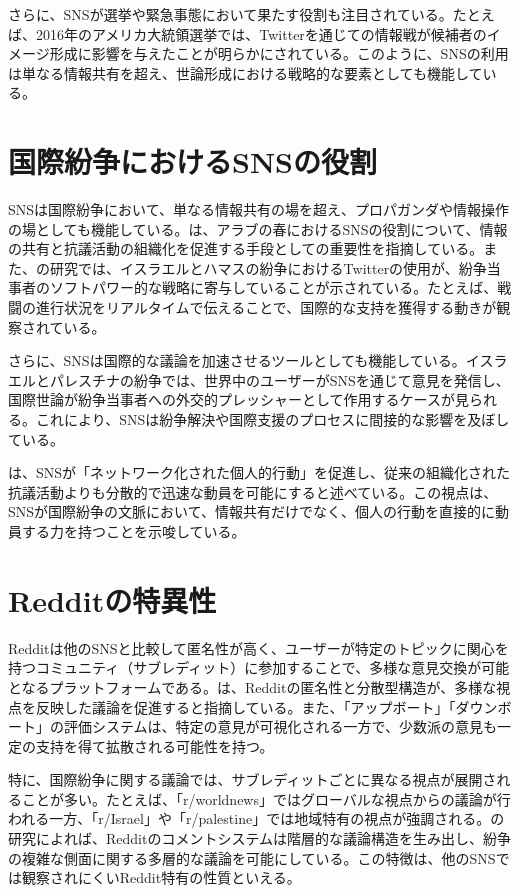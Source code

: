 \documentclass[11pt, a4j]{jreport}
\begin{document}
    さらに、SNSが選挙や緊急事態において果たす役割も注目されている。たとえば、2016年のアメリカ大統領選挙では、Twitterを通じての情報戦が候補者のイメージ形成に影響を与えたことが明らかにされている\citep{allcott-gentzkow2017}。このように、SNSの利用は単なる情報共有を超え、世論形成における戦略的な要素としても機能している。

    \section{国際紛争におけるSNSの役割}
    SNSは国際紛争において、単なる情報共有の場を超え、プロパガンダや情報操作の場としても機能している。\citet{howard-hussain2013}は、アラブの春におけるSNSの役割について、情報の共有と抗議活動の組織化を促進する手段としての重要性を指摘している。また、\citet{zeitzoff2017}の研究では、イスラエルとハマスの紛争におけるTwitterの使用が、紛争当事者のソフトパワー的な戦略に寄与していることが示されている。たとえば、戦闘の進行状況をリアルタイムで伝えることで、国際的な支持を獲得する動きが観察されている。

    さらに、SNSは国際的な議論を加速させるツールとしても機能している。イスラエルとパレスチナの紛争では、世界中のユーザーがSNSを通じて意見を発信し、国際世論が紛争当事者への外交的プレッシャーとして作用するケースが見られる。これにより、SNSは紛争解決や国際支援のプロセスに間接的な影響を及ぼしている。

    \citet{bennett2013logic}は、SNSが「ネットワーク化された個人的行動」を促進し、従来の組織化された抗議活動よりも分散的で迅速な動員を可能にすると述べている。この視点は、SNSが国際紛争の文脈において、情報共有だけでなく、個人の行動を直接的に動員する力を持つことを示唆している。

    \section{Redditの特異性}
    Redditは他のSNSと比較して匿名性が高く、ユーザーが特定のトピックに関心を持つコミュニティ（サブレディット）に参加することで、多様な意見交換が可能となるプラットフォームである。\citet{massanari2015participatory}は、Redditの匿名性と分散型構造が、多様な視点を反映した議論を促進すると指摘している。また、「アップボート」「ダウンボート」の評価システムは、特定の意見が可視化される一方で、少数派の意見も一定の支持を得て拡散される可能性を持つ。

    特に、国際紛争に関する議論では、サブレディットごとに異なる視点が展開されることが多い。たとえば、「r/worldnews」ではグローバルな視点からの議論が行われる一方、「r/Israel」や「r/palestine」では地域特有の視点が強調される。\citet{gaffney2018caveat}の研究によれば、Redditのコメントシステムは階層的な議論構造を生み出し、紛争の複雑な側面に関する多層的な議論を可能にしている。この特徴は、他のSNSでは観察されにくいReddit特有の性質といえる。
\end{document}
